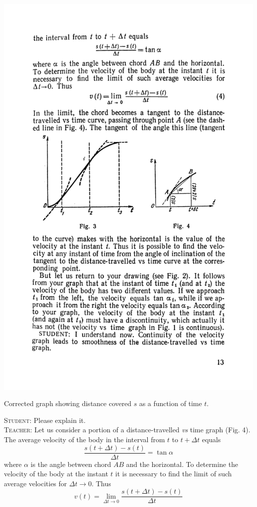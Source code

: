 \documentclass[a4paper,sfsidenotes]{tufte-book}
\begin{document}
\begin{marginfigure}%
\centering
\includegraphics[width=1.1\linewidth]{fig-003a.pdf}
\caption{Corrected graph showing distance covered $s$ as a function of time $t$.}
\label{fig-03}
\end{marginfigure}
\textsc{Student:} Please explain it. \\
\textsc{Teacher:} Let us consider a portion of a distance-travelled \emph{vs} time graph (Fig. 4). The average velocity of the body in the interval from $t$ to $t+\Delta t$ equals 
\begin{equation*}%
\frac{s(t+\Delta t) - s(t)}{\Delta t}= \tan \alpha
\end{equation*}
where $\alpha$ is the angle between chord $AB$ and the horizontal. To determine the velocity of the body at the instant $t$ it is necessary to find the limit of such average velocities for $\Delta t \rightarrow 0$. Thus
\begin{equation}
v(t)=\lim_{\Delta t \rightarrow 0} \frac{s(t+\Delta t)-s(t)}{\Delta t}
\label{eq-004}
\end{equation}
\end{document}
